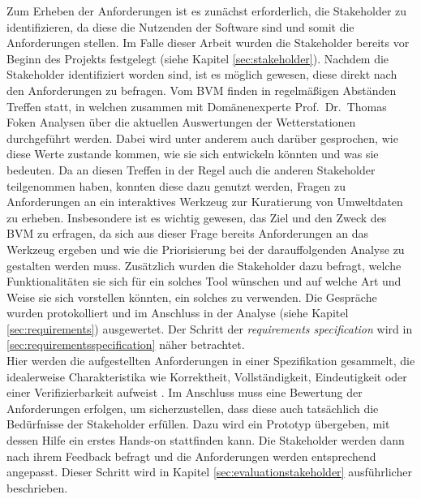 Zum Erheben der Anforderungen ist es zunächst erforderlich, die Stakeholder zu identifizieren, da diese die Nutzenden der Software sind und somit die Anforderungen stellen. Im Falle dieser Arbeit wurden die Stakeholder bereits vor Beginn des Projekts festgelegt (siehe Kapitel \ref{sec:stakeholder}). Nachdem die Stakeholder identifiziert worden sind, ist es möglich gewesen, diese direkt nach den Anforderungen zu befragen. Vom \ac{BVM} finden in regelmäßigen Abständen Treffen statt, in welchen zusammen mit Domänenexperte Prof.\ Dr.\ Thomas Foken Analysen über die aktuellen Auswertungen der Wetterstationen durchgeführt werden. Dabei wird unter anderem auch darüber gesprochen, wie diese Werte zustande kommen, wie sie sich entwickeln könnten und was sie bedeuten. Da an diesen Treffen in der Regel auch die anderen Stakeholder teilgenommen haben, konnten diese dazu genutzt werden, Fragen zu Anforderungen an ein interaktives Werkzeug zur Kuratierung von Umweltdaten zu erheben. Insbesondere ist es wichtig gewesen, das Ziel und den Zweck des \ac{BVM} zu erfragen, da sich aus dieser Frage bereits Anforderungen an das Werkzeug ergeben und wie die Priorisierung bei der darauffolgenden Analyse zu gestalten werden muss. Zusätzlich wurden die Stakeholder dazu befragt, welche Funktionalitäten sie sich für ein solches Tool wünschen und auf welche Art und Weise sie sich vorstellen könnten, ein solches zu verwenden. Die Gespräche wurden protokolliert und im Anschluss in der Analyse (siehe Kapitel \ref{sec:requirements}) ausgewertet. Der Schritt der \textit{requirements specification} wird in \ref{sec:requirementsspecification} näher betrachtet. \\ Hier werden die aufgestellten Anforderungen in einer Spezifikation gesammelt, die idealerweise Charakteristika wie Korrektheit, Vollständigkeit, Eindeutigkeit oder einer Verifizierbarkeit aufweist \cite{institute1984ieee}. Im Anschluss muss eine Bewertung der Anforderungen erfolgen, um sicherzustellen, dass diese auch tatsächlich die Bedürfnisse der Stakeholder erfüllen. Dazu wird ein Prototyp übergeben, mit dessen Hilfe ein erstes Hands-on stattfinden kann. Die Stakeholder werden dann nach ihrem Feedback befragt und die Anforderungen werden entsprechend angepasst. Dieser Schritt wird in Kapitel \ref{sec:evaluationstakeholder} ausführlicher beschrieben. 

